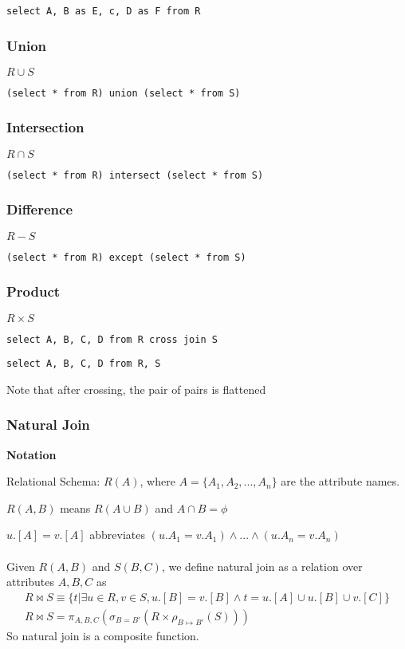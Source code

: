 \documentclass[12pt,a4paper]{article} %
\begin{document}
\verb|select A, B as E, c, D as F from R|
\subsubsection{Union}
$R\cup S$

\verb|(select * from R) union (select * from S)|
\subsubsection{Intersection}
$R\cap S$

\verb|(select * from R) intersect (select * from S)|

\subsubsection{Difference}
$R - S$

\verb|(select * from R) except (select * from S)|
\subsubsection{Product}
$R\times S$

\verb|select A, B, C, D from R cross join S|

\verb|select A, B, C, D from R, S|

Note that after crossing, the pair of pairs is flattened
\subsubsection{Natural Join}
\textbf{Notation}

Relational Schema: $R(A)$, where $A=\{A_1, A_2, ...,A_n\}$ are the attribute names.

$R(A,B)$ means $R(A\cup B)$ and $A\cap B=\phi$

$u.[A]=v.[A]$ abbreviates $(u.A_1=v.A_1)\land...\land (u.A_n=v.A_n)$
\\\\
Given $R(A,B)$ and $S(B,C)$, we define natural join as a relation over attributes $A, B, C$ as
\begin{align*}
R\bowtie S\equiv \{t|\exists u\in R,v\in S,u.[B]=v.[B]\land t=u.[A]\cup u.[B] \cup v.[C]\}\\
R\bowtie S=\pi_{A,B,C}(\sigma_{B=B'}(R\times\rho_{B\mapsto B'}(S)))
\end{align*}
So natural join is a composite function.
\end{document}

